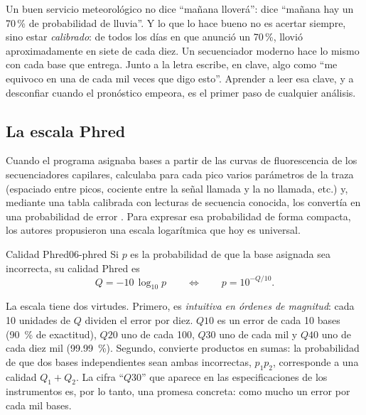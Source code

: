 \begin{intuicion}
Un buen servicio meteorológico no dice ``mañana lloverá'': dice ``mañana hay un 70\,\% de probabilidad de lluvia''. Y lo que lo hace bueno no es acertar siempre, sino estar \emph{calibrado}: de todos los días en que anunció un 70\,\%, llovió aproximadamente en siete de cada diez. Un secuenciador moderno hace lo mismo con cada base que entrega. Junto a la letra  escribe, en clave, algo como ``me equivoco en una de cada mil veces que digo esto''. Aprender a leer esa clave, y a desconfiar cuando el pronóstico empeora, es el primer paso de cualquier análisis.
\end{intuicion}

\subsection{La escala Phred}

Cuando el programa  asignaba bases a partir de las curvas de fluorescencia de los secuenciadores capilares, calculaba para cada pico varios parámetros de la traza (espaciado entre picos, cociente entre la señal llamada y la no llamada, etc.) y, mediante una tabla calibrada con lecturas de secuencia conocida, los convertía en una probabilidad de error \parencite{c06-ewing1998a,c06-ewing1998b}. Para expresar esa probabilidad de forma compacta, los autores propusieron una escala logarítmica que hoy es universal.

\begin{definicion}{Calidad Phred}{06-phred}
Si $p$ es la probabilidad de que la base asignada sea incorrecta, su calidad Phred es
\begin{equation}\label{eq:06-phred}
Q = -10\,\log_{10} p \qquad\Longleftrightarrow\qquad p = 10^{-Q/10}.
\end{equation}
\end{definicion}

\begin{simbolos}
\end{simbolos}

La escala tiene dos virtudes. Primero, es \emph{intuitiva en órdenes de magnitud}: cada 10 unidades de $Q$ dividen el error por diez. $Q10$ es un error de cada 10 bases (\SI{90}{\percent} de exactitud), $Q20$ uno de cada 100, $Q30$ uno de cada mil y $Q40$ uno de cada diez mil (\SI{99,99}{\percent}). Segundo, convierte productos en sumas: la probabilidad de que dos bases independientes sean ambas incorrectas, $p_1p_2$, corresponde a una calidad $Q_1+Q_2$. La cifra ``$Q30$'' que aparece en las especificaciones de los instrumentos es, por lo tanto, una promesa concreta: como mucho un error por cada mil bases.

